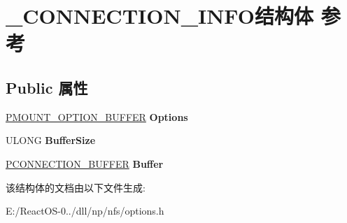 \hypertarget{struct___c_o_n_n_e_c_t_i_o_n___i_n_f_o}{}\section{\+\_\+\+C\+O\+N\+N\+E\+C\+T\+I\+O\+N\+\_\+\+I\+N\+F\+O结构体 参考}
\label{struct___c_o_n_n_e_c_t_i_o_n___i_n_f_o}
\subsection*{Public 属性}
\begin{DoxyCompactItemize}
\item 
\mbox{\label{struct___c_o_n_n_e_c_t_i_o_n___i_n_f_o_aeaf397efaa6aff577d02bf90e014d34b}} 
\hyperlink{struct___m_o_u_n_t___o_p_t_i_o_n___b_u_f_f_e_r}{P\+M\+O\+U\+N\+T\+\_\+\+O\+P\+T\+I\+O\+N\+\_\+\+B\+U\+F\+F\+ER} {\bfseries Options}
\item 
\mbox{\label{struct___c_o_n_n_e_c_t_i_o_n___i_n_f_o_a86df157156689958cb7f10109549252a}} 
U\+L\+O\+NG {\bfseries Buffer\+Size}
\item 
\mbox{\label{struct___c_o_n_n_e_c_t_i_o_n___i_n_f_o_a8cb86402863f19b32c15bb4a77e32483}} 
\hyperlink{struct___c_o_n_n_e_c_t_i_o_n___b_u_f_f_e_r}{P\+C\+O\+N\+N\+E\+C\+T\+I\+O\+N\+\_\+\+B\+U\+F\+F\+ER} {\bfseries Buffer}
\end{DoxyCompactItemize}


该结构体的文档由以下文件生成\+:\begin{DoxyCompactItemize}
\item 
E\+:/\+React\+O\+S-\/0../dll/np/nfs/options.\+h\end{DoxyCompactItemize}
